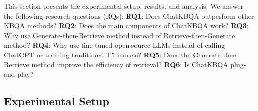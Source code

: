 \documentclass{article} \usepackage{iclr2024_conference,times}
\begin{document}
This section presents the experimental setup, results, and analysis. We answer the following research questions (RQs):
\textbf{RQ1}: Does ChatKBQA outperform other KBQA methods?
\textbf{RQ2}: Does the main components of ChatKBQA work?
\textbf{RQ3}: Why use Generate-then-Retrieve method instead of Retrieve-then-Generate method?
\textbf{RQ4}: Why use fine-tuned open-source LLMs instead of calling ChatGPT or training traditional T5 models?
\textbf{RQ5}: Does the Generate-then-Retrieve method improve the efficiency of retrieval?
\textbf{RQ6}: Is ChatKBQA plug-and-play?



\subsection{Experimental Setup}
\end{document}
